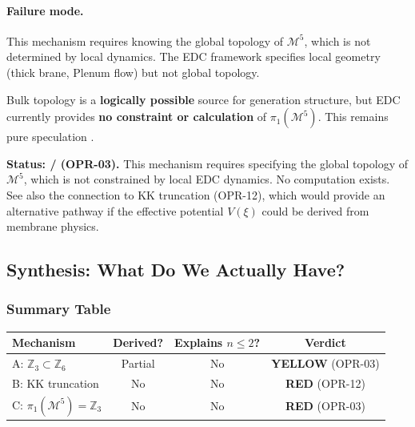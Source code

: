 \paragraph{Failure mode.}
This mechanism requires knowing the global topology of $\mathcal{M}^5$, which is not
determined by local dynamics. The EDC framework specifies local geometry
(thick brane, Plenum flow) but not global topology.

\begin{tcolorbox}[colback=red!5, colframe=red!50!black,
    title=\textbf{Mechanism C Verdict: RED}]
Bulk topology is a \textbf{logically possible} source for generation structure,
but EDC currently provides \textbf{no constraint or calculation} of $\pi_1(\mathcal{M}^5)$.
This remains pure speculation \tagP{}.

\medskip
\noindent\textbf{Status: \tagP{}/\tagOPEN{} (OPR-03).}
This mechanism requires specifying the global topology of $\mathcal{M}^5$, which is
not constrained by local EDC dynamics. No computation exists. See also the connection
to KK truncation (OPR-12), which would provide an alternative pathway if the effective
potential $V(\xi)$ could be derived from membrane physics.
\end{tcolorbox}

\subsection{Synthesis: What Do We Actually Have?}
\label{sec:ch5_synthesis}

\subsubsection{Summary Table}

\begin{center}
\begin{tabular}{p{4cm}ccc}
\toprule
\textbf{Mechanism} & \textbf{Derived?} & \textbf{Explains $n \leq 2$?} & \textbf{Verdict} \\
\midrule
A: $\mathbb{Z}_3 \subset \mathbb{Z}_6$ & Partial \tagI{} & No & \textcolor{orange!80!black}{\textbf{YELLOW}} (OPR-03) \\
B: KK truncation & No \tagP{} & No & \textcolor{red!80!black}{\textbf{RED}} (OPR-12) \\
C: $\pi_1(\mathcal{M}^5) = \mathbb{Z}_3$ & No \tagP{} & No & \textcolor{red!80!black}{\textbf{RED}} (OPR-03) \\
\bottomrule
\end{tabular}
\end{center}

